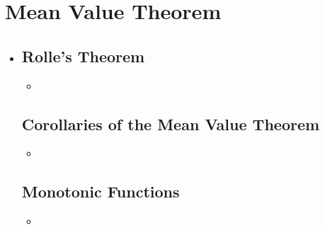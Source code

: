 \section{Mean Value Theorem}
\begin{itemize}
  \item []

  \subsection{Rolle's Theorem}
  \begin{itemize}
    \item
  \end{itemize}

  \subsection{Corollaries of the Mean Value Theorem}
  \begin{itemize}
    \item
  \end{itemize}

  \subsection{Monotonic Functions}
  \begin{itemize}
  \item []
  \end{itemize}

\end{itemize}

